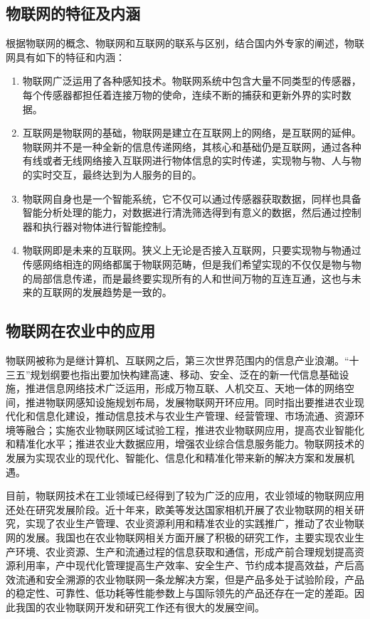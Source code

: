 	\subsection{物联网的特征及内涵}
	根据物联网的概念、物联网和互联网的联系与区别，结合国内外专家的阐述，物联网具有如下的特征和内涵：
	\begin{enumerate}
  			\item 物联网广泛运用了各种感知技术。物联网系统中包含大量不同类型的传感器，每个传感器都担任着连接万物的使命，连续不断的捕获和更新外界的实时数据。
  			\item 互联网是物联网的基础，物联网是建立在互联网上的网络，是互联网的延伸。物联网并不是一种全新的信息传递网络，其核心和基础仍是互联网，通过各种有线或者无线网络接入互联网进行物体信息的实时传递，实现物与物、人与物的实时交互，最终达到为人服务的目的。
  			\item 物联网自身也是一个智能系统，它不仅可以通过传感器获取数据，同样也具备智能分析处理的能力，对数据进行清洗筛选得到有意义的数据，然后通过控制器和执行器对物体进行智能控制。
  			\item 物联网即是未来的互联网。狭义上无论是否接入互联网，只要实现物与物通过传感网络相连的网络都属于物联网范畴，但是我们希望实现的不仅仅是物与物的局部信息传递，而是最终要实现所有的人和世间万物的互连互通，这也与未来的互联网的发展趋势是一致的。
	\end{enumerate}
	
	\subsection{物联网在农业中的应用}
	物联网被称为是继计算机、互联网之后，第三次世界范围内的信息产业浪潮\supercite{LingZhihao2010}。“十三五”规划纲要也指出要加快构建高速、移动、安全、泛在的新一代信息基础设施，推进信息网络技术广泛运用，形成万物互联、人机交互、天地一体的网络空间，推进物联网感知设施规划布局，发展物联网开环应用。同时指出要推进农业现代化和信息化建设，推动信息技术与农业生产管理、经营管理、市场流通、资源环境等融合；实施农业物联网区域试验工程，推进农业物联网应用，提高农业智能化和精准化水平；推进农业大数据应用，增强农业综合信息服务能力。物联网技术的发展为实现农业的现代化、智能化、信息化和精准化带来新的解决方案和发展机遇。
	
	目前，物联网技术在工业领域已经得到了较为广泛的应用，农业领域的物联网应用还处在研究发展阶段。近十年来，欧美等发达国家相机开展了农业物联网的相关研究，实现了农业生产管理、农业资源利用和精准农业的实践推广，推动了农业物联网的发展。我国也在农业物联网相关方面开展了积极的研究工作，主要实现农业生产环境、农业资源、生产和流通过程的信息获取和通信，形成产前合理规划提高资源利用率，产中现代化管理提高生产效率、安全生产、节约成本提高效益，产后高效流通和安全溯源的农业物联网一条龙解决方案，但是产品多处于试验阶段，产品的稳定性、可靠性、低功耗等性能参数上与国际领先的产品还存在一定的差距。因此我国的农业物联网开发和研究工作还有很大的发展空间\supercite{ChenWei2013}。
	
